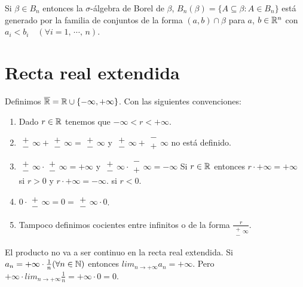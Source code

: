 \begin{eg}
    Si $\beta \in B_n$ entonces la $\sigma$-álgebra de Borel de $\beta$, $B_n(\beta) = \{ A \subseteq \beta : A \in B_n \}$ está generado por la familia de conjuntos
    de la forma $(a, b) \cap \beta$ para $a$, $b \in \mathbb{R}^n$ con $a_i < b_i \quad (\forall i = 1 \text{, } \cdots \text{, } n)$.
\end{eg}

\section{Recta real extendida}

\begin{definition}
    Definimos $\overline{\mathbb{R}} = \mathbb{R} \cup \{ -\infty, +\infty \}$. Con las siguientes convenciones:
    \begin{enumerate}
        \item Dado $r \in \mathbb{R}$ tenemos que $-\infty < r < +\infty$.
        \item $\substack{+ \\ -} \infty + \substack{+ \\ -} \infty = \substack{+ \\ -} \infty$ y
              $\substack{+ \\ -} \infty + \substack{- \\ +} \infty$ no está definido.
        \item $\substack{+ \\ -} \infty \cdot \substack{+ \\ -} \infty = +\infty$ y
              $\substack{+ \\ -} \infty \cdot \substack{- \\ +} \infty = -\infty$
              Si $r \in \mathbb{R}$ entonces $r \cdot +\infty = +\infty$ si $r > 0$ y $r \cdot +\infty = -\infty$. si $r < 0$.
        \item $0 \cdot \substack{+ \\ -} \infty = 0 = \substack{+ \\ -} \infty \cdot 0$.
        \item Tampoco definimos cocientes entre infinitos o de la forma $\frac{r}{\substack{+ \\ -} \infty}$.
    \end{enumerate}
\end{definition}

\begin{note}
    El producto no va a ser continuo en la recta real extendida.
    Si $a_n = +\infty \cdot \frac{1}{n} (\forall n \in \mathbb{N})$ entonces $lim_{n \to +\infty} a_n = +\infty$. Pero $+\infty \cdot lim_{n \to +\infty} \frac{1}{n} = +\infty \cdot 0 = 0$.
\end{note}

